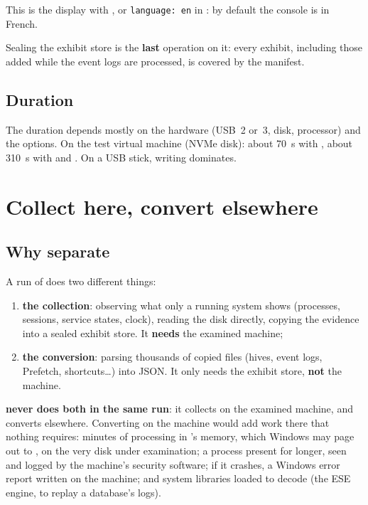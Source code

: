 \documentclass[11pt,a4paper,oneside]{report}
\begin{document}
This is the display with , or \texttt{language: en} in
: by default the console is in French.

Sealing the exhibit store is the \textbf{last} operation on it: every exhibit,
including those added while the event logs are processed, is covered by the
manifest.

\section{Duration}

The duration depends mostly on the hardware (USB~2 or~3, disk, processor) and
the options. On the test virtual machine (NVMe disk): about 70~s with
, about 310~s with  and . On a USB stick,
writing dominates.

\chapter{Collect here, convert elsewhere}\label{chap:separation}

\section{Why separate}

A run of \wac{} does two different things:
\begin{enumerate}
  \item \textbf{the collection}: observing what only a running system shows
        (processes, sessions, service states, clock), reading the disk
        directly, copying the evidence into a sealed exhibit store. It
        \textbf{needs} the examined machine;
  \item \textbf{the conversion}: parsing thousands of copied files (hives,
        event logs, Prefetch, shortcuts\ldots) into JSON. It only needs the
        exhibit store, \textbf{not} the machine.
\end{enumerate}

\wac{} \textbf{never does both in the same run}: it collects on the examined
machine, and converts elsewhere. Converting on the machine would add work there
that nothing requires: minutes of processing in \wac{}'s memory, which Windows
may page out to , on the very disk under examination; a
process present for longer, seen and logged by the machine's security
software; if it crashes, a Windows error report written on the machine; and
system libraries loaded to decode (the ESE engine, to replay a database's
logs).
\end{document}
